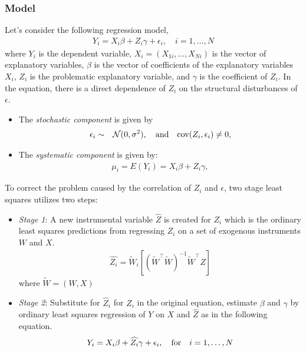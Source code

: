 \documentclass[12pt]{book}%
\begin{document}
\subsubsection{Model}
Let's consider the following regression model,
\begin{eqnarray*}
Y_i=X_i\beta + Z_i\gamma + \epsilon_i, \quad  i=1,\ldots,N
\end{eqnarray*}
where $Y_i$ is the dependent variable, 
$X_i = (X_{1i},\ldots, X_{Ni})$ is the vector of explanatory variables, 
$\beta$ is the vector of coefficients of the explanatory variables $X_i$, 
$Z_i$ 
is the problematic explanatory variable, and $\gamma$ is the coefficient
 of $Z_i$.  In the equation, there is a direct dependence of $Z_i$ 
on the structural disturbances of $\epsilon$.
\begin{itemize}
\item The \emph{stochastic component} is given by
\begin{eqnarray*}
\epsilon_i  &  \sim & {\cal N}(0, \sigma^2), \quad {\rm and} \quad
{\rm cov}(Z_i, \epsilon_i) \ne 0,
\end{eqnarray*}
\item The \emph{systematic component} is given by:
\begin{eqnarray*}
\mu_{i}= E(Y_i)= X_{i}\beta + Z_i\gamma,
\end{eqnarray*}
\end{itemize}
\noindent To correct the problem caused by the correlation of $Z_i$ and $\epsilon$, 
two stage least squares utilizes two steps:
\begin{itemize}
\item \emph{Stage 1}: A new instrumental variable $\hat{Z}$ is created 
for $Z_i$ which is the ordinary least squares predictions from regressing 
$Z_i$ on a set of exogenous instruments $W$ and $X$.
\begin{eqnarray*}
\widehat{Z_i} = \widetilde{W}_i[(\widetilde{W}^\top\widetilde{W})^{-1}\widetilde{W}^\top Z]
\end{eqnarray*}
where $\widetilde{W} = (W,X)$
\item \emph{Stage 2}: Substitute for $\hat{Z}_i$ for $Z_i$ in the original 
equation, estimate $\beta$ and $\gamma$ by ordinary least squares regression
of $Y$ on $X$ and $\hat{Z}$ as in the following equation. 
\begin{eqnarray*}
Y_i=X_i\beta + \widehat{Z_i}\gamma + \epsilon_i,  \quad {\rm for} 
\quad   i=1,\ldots,N
\end{eqnarray*}
\end{itemize}
\end{document}
